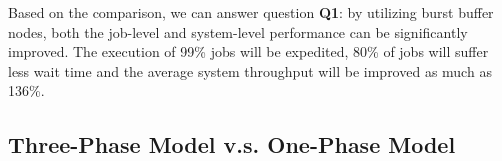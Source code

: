 Based on the comparison, we can answer question \textbf{Q1}: by utilizing burst buffer nodes,
both the job-level and system-level performance can be significantly improved.
The execution of 99\% jobs will be expedited, 80\% of jobs will suffer less wait time and the 
average system throughput will be improved as much as 136\%.




\subsection{Three-Phase Model v.s. One-Phase Model}


